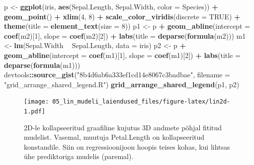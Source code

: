 \documentclass[]{book}
\newenvironment{Shaded}{\begin{snugshade}}{\end{snugshade}}
\newcommand{\DataTypeTok}[1]{\textcolor[rgb]{0.13,0.29,0.53}{#1}}
\newcommand{\DecValTok}[1]{\textcolor[rgb]{0.00,0.00,0.81}{#1}}
\newcommand{\KeywordTok}[1]{\textcolor[rgb]{0.13,0.29,0.53}{\textbf{#1}}}
\newcommand{\NormalTok}[1]{#1}
\newcommand{\OperatorTok}[1]{\textcolor[rgb]{0.81,0.36,0.00}{\textbf{#1}}}
\newcommand{\OtherTok}[1]{\textcolor[rgb]{0.56,0.35,0.01}{#1}}
\newcommand{\StringTok}[1]{\textcolor[rgb]{0.31,0.60,0.02}{#1}}
\begin{document}
\begin{Shaded}
\begin{Highlighting}[]
\NormalTok{p <-}\StringTok{ }\KeywordTok{ggplot}\NormalTok{(iris, }\KeywordTok{aes}\NormalTok{(Sepal.Length, Sepal.Width, }\DataTypeTok{color =}\NormalTok{ Species)) }\OperatorTok{+}
\StringTok{  }\KeywordTok{geom_point}\NormalTok{() }\OperatorTok{+}
\StringTok{  }\KeywordTok{xlim}\NormalTok{(}\DecValTok{4}\NormalTok{, }\DecValTok{8}\NormalTok{) }\OperatorTok{+}
\StringTok{  }\KeywordTok{scale_color_viridis}\NormalTok{(}\DataTypeTok{discrete =} \OtherTok{TRUE}\NormalTok{) }\OperatorTok{+}
\StringTok{  }\KeywordTok{theme}\NormalTok{(}\DataTypeTok{title =} \KeywordTok{element_text}\NormalTok{(}\DataTypeTok{size =} \DecValTok{8}\NormalTok{))}
\NormalTok{p1 <-}\StringTok{ }\NormalTok{p }\OperatorTok{+}\StringTok{ }\KeywordTok{geom_abline}\NormalTok{(}\DataTypeTok{intercept =} \KeywordTok{coef}\NormalTok{(m2)[}\DecValTok{1}\NormalTok{], }\DataTypeTok{slope =} \KeywordTok{coef}\NormalTok{(m2)[}\DecValTok{2}\NormalTok{]) }\OperatorTok{+}
\StringTok{  }\KeywordTok{labs}\NormalTok{(}\DataTypeTok{title =} \KeywordTok{deparse}\NormalTok{(}\KeywordTok{formula}\NormalTok{(m2)))}
\NormalTok{m1 <-}\StringTok{ }\KeywordTok{lm}\NormalTok{(Sepal.Width }\OperatorTok{~}\StringTok{ }\NormalTok{Sepal.Length, }\DataTypeTok{data =}\NormalTok{ iris)}
\NormalTok{p2 <-}\StringTok{ }\NormalTok{p }\OperatorTok{+}\StringTok{ }\KeywordTok{geom_abline}\NormalTok{(}\DataTypeTok{intercept =} \KeywordTok{coef}\NormalTok{(m1)[}\DecValTok{1}\NormalTok{], }\DataTypeTok{slope =} \KeywordTok{coef}\NormalTok{(m1)[}\DecValTok{2}\NormalTok{]) }\OperatorTok{+}
\StringTok{  }\KeywordTok{labs}\NormalTok{(}\DataTypeTok{title =} \KeywordTok{deparse}\NormalTok{(}\KeywordTok{formula}\NormalTok{(m1)))}
\NormalTok{devtools}\OperatorTok{::}\KeywordTok{source_gist}\NormalTok{(}\StringTok{"8b4d6ab6a333ef1cd14e8067c3badbae"}\NormalTok{, }\DataTypeTok{filename =} \StringTok{"grid_arrange_shared_legend.R"}\NormalTok{)}
\KeywordTok{grid_arrange_shared_legend}\NormalTok{(p1, p2)}
\end{Highlighting}
\end{Shaded}

\begin{figure}
\centering
\texttt{[image: 05\_lin\_mudeli\_laiendused\_files/figure-latex/lin2d-1.pdf]}
\caption{\label{fig:lin2d}2D-le kollapseeritud graafiline kujutus 3D andmete põhjal fititud mudelist. Vasemal, muutuja Petal.Length on kollapseeritud konstandile. Siin on regressioonijoon hoopis teises kohas, kui lihtsas ühe prediktoriga mudelis (paremal).}
\end{figure}
\end{document}
